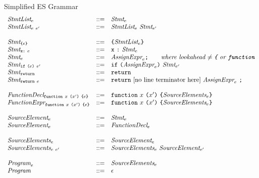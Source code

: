 \documentclass[onecolumn]{sigplanconf-onecolumn}
\begin{document}
\begin{displayfigure*}{\label{fig:grammar}Simplified ES Grammar}
\[\begin{array}{lcl}
  \textit{StmtList}_{e} &::=&
  \textit{Stmt}_{e}
  \\
  \textit{StmtList}_{e~e'} &::=&
  \textit{StmtList}_{e}~
  \textit{Stmt}_{e'}
  \\ \\
  \textit{Stmt}_{\texttt{\{}e\texttt{\}}} &::=& 
  \texttt{\{} \textit{StmtList}_{e} \texttt{\}} 
  \\
  \textit{Stmt}_{\texttt{x}\texttt{:}~e} &::=&
  \texttt{x}~\texttt{:}~\textit{Stmt}_{e}
  \\
  \textit{Stmt}_{e} &::=& 
  \textit{AssignExpr}_{e} \texttt{;}
  \qquad  \textit{where lookahead \( \not =
    \texttt{\{} \) or \( \texttt{function} \)}
  \\
  \textit{Stmt}_{\texttt{if}~\texttt{(}e\texttt{)}~e'} &::=& 
  \texttt{if}~\texttt{(}\textit{AssignExpr}_{e}\texttt{)}~\textit{Stmt}_{e'}
  \\
  \textit{Stmt}_{\texttt{return}} &::=& 
  \texttt{return}
  \\
  \textit{Stmt}_{\texttt{return}~e} &::=& 
  \texttt{return}~\textrm{[no line terminator
    here]}~\textit{AssignExpr}_{e}~\texttt{;}
  \\ \\
  \textit{FunctionDecl}_{\texttt{function}~x~\texttt{(}x'\texttt{)}~\texttt{\{}e\texttt{\}}} 
  &::=&
  \texttt{function}~x~\texttt{(}x'\texttt{)}~
  \texttt{\{}\textit{SourceElements}_{e}\texttt{\}}
  \\
  \textit{FunctionExpr}_{\texttt{function}~x~\texttt{(}x'\texttt{)}~\texttt{\{}e\texttt{\}}} 
  &::=&
  \texttt{function}~x~\texttt{(}x'\texttt{)}~
  \texttt{\{}\textit{SourceElements}_{e}\texttt{\}}
  \\ \\
  \textit{SourceElement}_{e} &::=& \textit{Stmt}_{e} 
  \\
  \textit{SourceElement}_{e} &::=& \textit{FunctionDecl}_{e}
  \\ \\

  \textit{SourceElements}_{e} &::=& \textit{SourceElement}_{e}
  \\
  \textit{SourceElements}_{e~e'} &::=& \textit{SourceElements}_{e}~\textit{SourceElement}_{e'}
  \\ \\
  \textit{Program}_{e} &::=& \textit{SourceElements}_{e}
  \\
  \textit{Program}_{} &::=& \epsilon
\end{array}
\]  
\end{displayfigure*}
\end{document}
